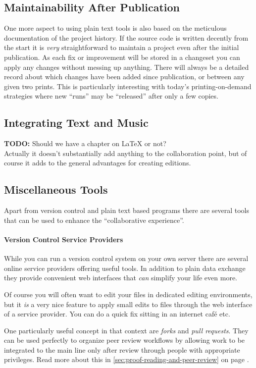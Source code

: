 \documentclass[11pt,a4paper]{article}
\begin{document}
\subsection{Maintainability After Publication}
One more aspect to using plain text tools is also based on the meticulous documentation
of the project history. If the source code is written decently from the start it is
\emph{very} straightforward to maintain a project even after the initial publication.
As each fix or improvement will be stored in a changeset you can apply any changes
without messing up anything. There will always be a detailed record about which
changes have been added since publication, or between any given two prints. This is
particularly interesting with today's printing-on-demand strategies where new “runs”
may be “released” after only a few copies.


\subsection{Integrating Text and Music}
\textbf{TODO:} Should we have a chapter on LaTeX or not?\\
Actually it doesn't substantially add anything to the collaboration point,
but of course it adds to the general advantages for creating editions.

\subsection{Miscellaneous Tools}
Apart from version control and plain text based programs there are several tools that
can be used to enhance the “collaborative experience”.

\paragraph{Version Control Service Providers}
While you can run a version control system on your own server there are several online service providers offering useful tools. In addition to plain data exchange they
provide convenient web interfaces that \emph{can} simplify your life even more.

Of course you will often want to edit your files in dedicated editing environments, but
it \emph{is} a very nice feature to apply small edits to files through the web interface
of a service provider. You can do a quick fix sitting in an internet café etc.

One particularly useful concept in that context are \emph{forks} and \emph{pull requests}.
They can be used perfectly to organize peer review workflows by allowing work to be
integrated to the main line only after review through people with appropriate privileges.
Read more about this in \ref{sec:proof-reading-and-peer-review} on page \pageref{sec:proof-reading-and-peer-review}.
\end{document}
